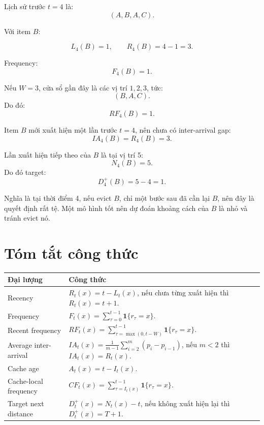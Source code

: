 \documentclass[11pt,a4paper]{article}
\newcommand{\ind}[1]{\mathbf{1}\{#1\}}
\begin{document}
Lịch sử trước \(t=4\) là:
\[
    (A,B,A,C).
\]

Với item \(B\):

\[
    L_4(B)=1,
    \qquad
    R_4(B)=4-1=3.
\]

Frequency:
\[
    F_4(B)=1.
\]

Nếu \(W=3\), cửa sổ gần đây là các vị trí \(1,2,3\), tức:
\[
    (B,A,C).
\]
Do đó:
\[
    RF_4(B)=1.
\]

Item \(B\) mới xuất hiện một lần trước \(t=4\), nên chưa có inter-arrival gap:
\[
    IA_4(B)=R_4(B)=3.
\]

Lần xuất hiện tiếp theo của \(B\) là tại vị trí 5:
\[
    N_4(B)=5.
\]
Do đó target:
\[
    D_4^+(B)=5-4=1.
\]

Nghĩa là tại thời điểm 4, nếu evict \(B\), chỉ một bước sau đã cần lại \(B\), nên đây là quyết định rất tệ. Một mô hình tốt nên dự đoán khoảng cách của \(B\) là nhỏ và tránh evict nó.

\section{Tóm tắt công thức}

\begin{center}
\begin{tabularx}{\textwidth}{lX}
\toprule
Đại lượng & Công thức \\
\midrule
Recency & \(R_t(x)=t-L_t(x)\), nếu chưa từng xuất hiện thì \(R_t(x)=t+1\). \\
Frequency & \(F_t(x)=\sum_{\tau=0}^{t-1}\ind{r_{\tau}=x}\). \\
Recent frequency & \(RF_t(x)=\sum_{\tau=\max(0,t-W)}^{t-1}\ind{r_{\tau}=x}\). \\
Average inter-arrival & \(IA_t(x)=\frac{1}{m-1}\sum_{i=2}^{m}(p_i-p_{i-1})\), nếu \(m<2\) thì \(IA_t(x)=R_t(x)\). \\
Cache age & \(A_t(x)=t-I_t(x)\). \\
Cache-local frequency & \(CF_t(x)=\sum_{\tau=I_t(x)}^{t-1}\ind{r_{\tau}=x}\). \\
Target next distance & \(D_t^+(x)=N_t(x)-t\), nếu không xuất hiện lại thì \(D_t^+(x)=T+1\). \\
\bottomrule
\end{tabularx}
\end{center}
\end{document}
